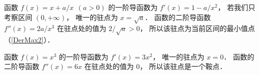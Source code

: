 \begin{exam}{}\label{DerMax_ex2}
函数 $f(x) = x+a/x \ \ (a > 0)$ 的一阶导函数为 $f'(x) = 1 - a/x^2$， 若我们只考察区间 $(0, +\infty)$， 唯一的驻点为 $x = \sqrt{a}$． 函数的二阶导函数 $f''(x) = 2a/x^3$ 在驻点处的值为 $2/\sqrt{a} > 0$， 所以该驻点为当前区间的最小值点（\autoref{DerMax2}）．
\end{exam}

\begin{exam}{}\label{DerMax_ex3}
函数 $f(x) = x^3$ 的一阶导函数为 $f'(x) = 3x^2$， 唯一的驻点为 $x = 0$． 函数的二阶导函数 $f''(x) = 6x$ 在驻点处的值为 $0$， 所以该驻点是一个鞍点．
\end{exam}











